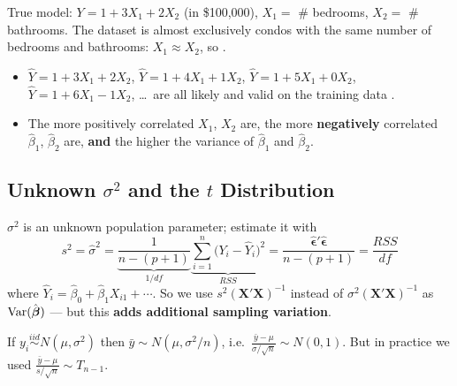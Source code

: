 \begin{example}
    True model: $Y=1+3X_1+2X_2$ (in \$100{,}000), $X_1=$ \# bedrooms, $X_2=$ \# bathrooms.
    The dataset is almost exclusively condos with the same number of bedrooms and
    bathrooms: $X_1\approx X_2$, so .
    \begin{itemize}
        \item $\hat Y=1+3X_1+2X_2$, $\hat Y=1+4X_1+1X_2$, $\hat Y=1+5X_1+0X_2$,
        $\hat Y=1+6X_1-1X_2$, \dots\ are all likely and valid on the training data
        .
        \item The more positively correlated $X_1$, $X_2$ are, the more
        \textbf{negatively} correlated $\hat\beta_1$, $\hat\beta_2$ are, \textbf{and}
        the higher the variance of $\hat\beta_1$ and $\hat\beta_2$.
    \end{itemize}
\end{example}

\subsection{Unknown $\sigma^2$ and the $t$ Distribution}

\begin{definition}
    $\sigma^2$ is an unknown population parameter; estimate it with
    \[\boxed{s^2=\hat\sigma^2=\underbrace{\frac{1}{n-(p+1)}}_{1/df}\underbrace{\sum_{i=1}^n\big(Y_i-\hat Y_i\big)^2}_{RSS}
    =\frac{\hat{\boldsymbol\epsilon}'\hat{\boldsymbol\epsilon}}{n-(p+1)}=\frac{RSS}{df}}\]
    where $\hat Y_i=\hat\beta_0+\hat\beta_1X_{i1}+\cdots$. So we use
    $s^2(\mathbf{X}'\mathbf{X})^{-1}$ instead of $\sigma^2(\mathbf{X}'\mathbf{X})^{-1}$
    as $\operatorname{Var}(\hat{\boldsymbol\beta})$ --- but this \textbf{adds additional sampling variation}.
\end{definition}

\begin{remark}
    If $y_i\overset{iid}\sim N(\mu,\sigma^2)$ then $\bar y\sim N(\mu,\sigma^2/n)$, i.e.\
    $\frac{\bar y-\mu}{\sigma/\sqrt n}\sim N(0,1)$. But in practice we used
    $\frac{\bar y-\mu}{s/\sqrt n}\sim T_{n-1}$.
\end{remark}

